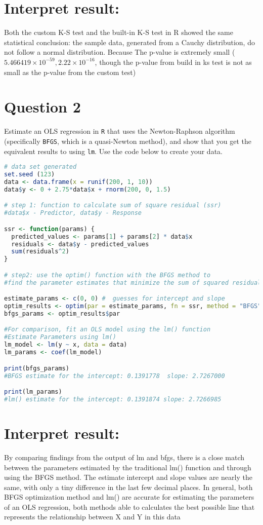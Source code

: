 \documentclass[12pt,letterpaper]{article}
\begin{document}
\section*{Interpret result:}
\noindent  Both the custom K-S test and the built-in K-S test in R showed the same statistical conclusion: the sample data,  generated from a Cauchy distribution, do not follow a normal distribution. Because The p-value is extremely small ($5.466419 \times 10^{-59}, 2.22 \times 10^{-16}$, though the p-value from build in ks test is not as small as the p-value from the custom test)

 
\newpage
\section*{Question 2}
\noindent Estimate an OLS regression in \texttt{R} that uses the Newton-Raphson algorithm (specifically \texttt{BFGS}, which is a quasi-Newton method), and show that you get the equivalent results to using \texttt{lm}. Use the code below to create your data.
\vspace{.5cm}
\begin{lstlisting}[language=R]
# data set generated
set.seed (123)
data <- data.frame(x = runif(200, 1, 10))
data$y <- 0 + 2.75*data$x + rnorm(200, 0, 1.5)

# step 1: function to calculate sum of square residual (ssr)
#data$x - Predictor, data$y - Response

ssr <- function(params) {
  predicted_values <- params[1] + params[2] * data$x
  residuals <- data$y - predicted_values
  sum(residuals^2)
}

# step2: use the optim() function with the BFGS method to
#find the parameter estimates that minimize the sum of squared residuals

estimate_params <- c(0, 0) #  guesses for intercept and slope
optim_results <- optim(par = estimate_params, fn = ssr, method = "BFGS")
bfgs_params <- optim_results$par

#For comparison, fit an OLS model using the lm() function
#Estimate Parameters using lm()
lm_model <- lm(y ~ x, data = data)
lm_params <- coef(lm_model)

print(bfgs_params) 
#BFGS estimate for the intercept: 0.1391778  slope: 2.7267000

print(lm_params) 
#lm() estimate for the intercept: 0.1391874 slope: 2.7266985
\end{lstlisting}

\section*{Interpret result:}
\noindent By comparing findings from the output of lm and bfgs, there is a close match between the parameters estimated by the traditional lm() function and through using the BFGS method. The estimate intercept and slope values are nearly the same, with only a tiny difference in the last few decimal places. In general, both BFGS optimization method  and lm() are  accurate for estimating the parameters of an OLS regression,  both methods able to calculates the best possible line that represents the relationship between X and Y in this data
\end{document}
